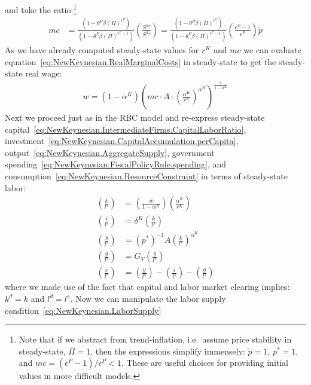   and take the ratio:\footnote{%
Note that if we abstract from trend-inflation, i.e.\ assume price stability in steady-state, \(\overline{\Pi}=1\),
  then the expressions simplify immensely: \(\widetilde{p} = 1\), \(p^{*}=1\), and \(mc = (\epsilon^{P}-1)/\epsilon^{P}<1\).
These are useful choices for providing initial values in more difficult models.
}
\begin{align*}
{mc} &= \frac{\left(1 - \theta^{P} \beta {(\Pi)}^{\epsilon^{P}}\right)}{\left(1 - \theta^{P} \beta {(\Pi)}^{\epsilon^{P}-1}\right)} \left(\frac{S^{1_{P}}}{S^{2_{P}}}\right)
= \frac{\left(1 - \theta^{P} \beta {(\Pi)}^{\epsilon^{P}}\right)}{\left(1 - \theta^{P} \beta {(\Pi)}^{\epsilon^{P}-1}\right)} \left(\frac{\epsilon^{P}-1}{\epsilon^{P}}\right) \widetilde{p}
\end{align*}
As we have already computed steady-state values for \(r^{K}\) and \({mc}\)
  we can evaluate equation~\eqref{eq:NewKeynesian.RealMarginalCosts} in steady-state to get the steady-state real wage:
\begin{align*}
w = (1-\alpha^{K}) {\left(mc \cdot A \cdot {\left(\frac{\alpha^{K}}{r^{K}}\right)}^{\alpha^{K}} \right)}^{\frac{1}{1-\alpha^{K}}}
\end{align*}
Next we proceed just as in the RBC model
  and re-express steady-state
  capital~\eqref{eq:NewKeynesian.IntermediateFirms.CapitalLaborRatio},
  investment~\eqref{eq:NewKeynesian.CapitalAccumulation.perCapita},
  output~\eqref{eq:NewKeynesian.AggregateSupply},
  government spending~\eqref{eq:NewKeynesian.FiscalPolicyRule.spending},
  and consumption~\eqref{eq:NewKeynesian.ResourceConstraint}
  in terms of steady-state labor:
\begin{align*}
\left(\frac{k}{l^{s}}\right) &= \left(\frac{w}{1-\alpha^{K}}\right) \left(\frac{\alpha^{K}}{r^{K}}\right)
\\
\left(\frac{i}{l^{s}}\right) &= \delta^{K} \left(\frac{k}{l^{s}}\right)
\\
\left(\frac{y}{l^{s}}\right) &= {(p^{*})}^{-1} A {\left(\frac{k}{l^{s}}\right)}^{\alpha^{K}}
\\
\left(\frac{g}{l^{s}}\right) &= \overline{G_{Y}} \left(\frac{y}{l^{s}}\right)
\\  
\left(\frac{c}{l^{s}}\right) &= \left(\frac{y}{l^{s}}\right) - \left(\frac{i}{l^{s}}\right) - \left(\frac{g}{l^{s}}\right)
\end{align*}
where we made use of the fact that capital and labor market clearing implies:
\(k^{d} = k\) and \(l^{d} = l^{s}\).
Now we can manipulate the labor supply condition~\eqref{eq:NewKeynesian.LaborSupply}
